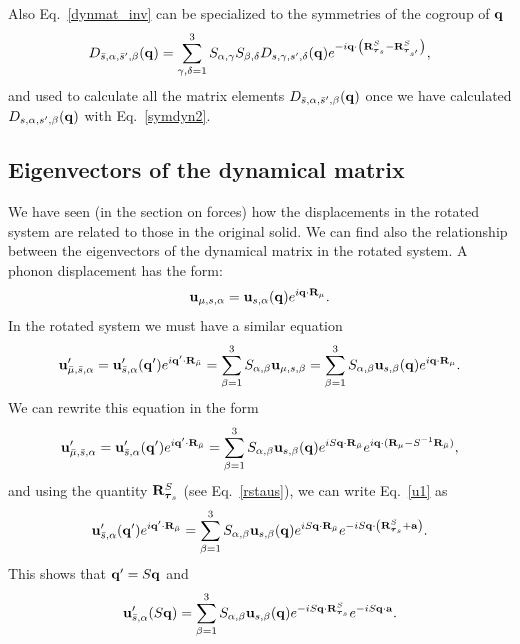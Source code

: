 \documentclass[12pt,a4paper,twoside]{report}
\begin{document}
Also Eq.~\ref{dynmat_inv} can be specialized to the symmetries of the cogroup of ${\bf q}$
\begin{equation}
D_{\bar s,\alpha,\bar s',\beta}({\bf q}) =
\sum_{\gamma,\delta=1}^3  S_{\alpha,\gamma} S_{\beta,\delta}
D_{s,\gamma,s',\delta}({\bf q})
e^{-i {\bf q} \cdot \left({\bf R}^{S}_{\boldsymbol{\tau}_s} - {\bf R}^{S}_{\boldsymbol{\tau}_{s'}} \right)},
\label{dynmat_inv_smallq}
\end{equation}
and used to calculate all the matrix elements  
$D_{\bar s,\alpha,\bar s',\beta}({\bf q})$ once
we have calculated 
$D_{s,\alpha,s',\beta}({\bf q})$ with Eq.~\ref{symdyn2}.

\subsection{Eigenvectors of the dynamical matrix}
We have seen (in the section on forces) how the displacements in the rotated system are related to those in the original solid. We can find also the relationship between the eigenvectors of the dynamical matrix in the rotated system. A phonon displacement has
the form:
\begin{equation}
{\bf u}_{\mu,s,\alpha}= {\bf u}_{s,\alpha}({\bf q}) e^{i{\bf q}\cdot {\bf R}_\mu}.
\end{equation}
In the rotated system we must have a similar equation
\begin{equation}
{\bf u}'_{{\bar \mu},{\bar s},\alpha}= {\bf u}'_{{\bar s},\alpha}({\bf q}') e^{i{\bf q}'\cdot {\bf R}_{\bar \mu}}= \sum_{\beta=1}^3 S_{\alpha,\beta} {\bf u}_{\mu,s,\beta} = \sum_{\beta=1}^3 S_{\alpha,\beta} {\bf u}_{s,\beta}({\bf q}) e^{i{\bf q}\cdot {\bf R}_\mu}
\label{u1}.
\end{equation}
We can rewrite this equation in the form
\begin{equation}
{\bf u}'_{{\bar \mu},{\bar s},\alpha}= {\bf u}'_{{\bar s},\alpha}({\bf q}') e^{i{\bf q}'\cdot {\bf R}_{\bar \mu}}= \sum_{\beta=1}^3 S_{\alpha,\beta} {\bf u}_{s,\beta}({\bf q}) 
e^{iS {\bf q}\cdot {\bf R}_{\bar \mu} }
e^{i{\bf q}\cdot ({\bf R}_\mu - S^{-1} {\bf R}_{\bar \mu}) }, 
\label{u1}
\end{equation}
and using the quantity ${\bf R}^S_{\boldsymbol{\tau}_s}$ (see Eq.~\ref{rstaus}), we can write
Eq.~\ref{u1} as 
\begin{equation}
{\bf u}'_{{\bar s},\alpha}({\bf q}') e^{i{\bf q}'\cdot {\bf R}_{\bar \mu}}=\sum_{\beta=1}^3 S_{\alpha,\beta} {\bf u}_{s,\beta}({\bf q}) e^{iS {\bf q}\cdot {\bf R}_{\bar \mu}} e^{-i S {\bf q} \cdot \left({\bf R}^S_{\boldsymbol{\tau}_s} + {\bf a} \right)}.
\end{equation}
This shows that ${\bf q}'=S {\bf q}$ and 
\begin{equation}
{\bf u}'_{{\bar s},\alpha}(S {\bf q}) 
= \sum_{\beta=1}^3 S_{\alpha,\beta} {\bf u}_{s,\beta}({\bf q}) e^{-iS {\bf q} \cdot 
{\bf R}^S_{\boldsymbol{\tau}_s}}
e^{-iS {\bf q} \cdot {\bf a}}.
\end{equation}
\end{document}
